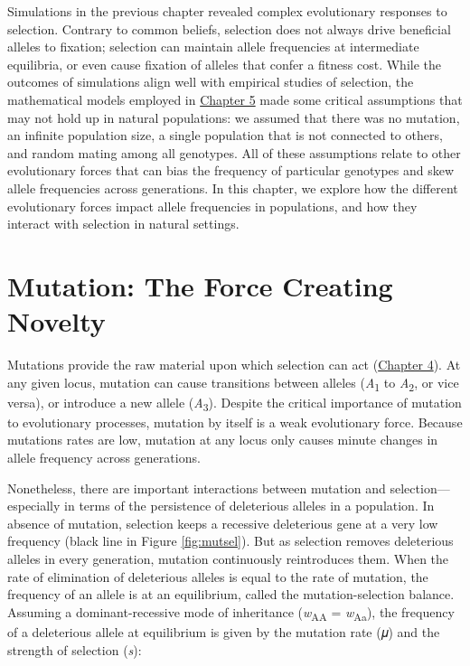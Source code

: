 \documentclass[
]{book}
\begin{document}
Simulations in the previous chapter revealed complex evolutionary responses to selection. Contrary to common beliefs, selection does not always drive beneficial alleles to fixation; selection can maintain allele frequencies at intermediate equilibria, or even cause fixation of alleles that confer a fitness cost. While the outcomes of simulations align well with empirical studies of selection, the mathematical models employed in \href{evolutionary-mechanisms-i-modeling-selection.html}{Chapter 5} made some critical assumptions that may not hold up in natural populations: we assumed that there was no mutation, an infinite population size, a single population that is not connected to others, and random mating among all genotypes. All of these assumptions relate to other evolutionary forces that can bias the frequency of particular genotypes and skew allele frequencies across generations. In this chapter, we explore how the different evolutionary forces impact allele frequencies in populations, and how they interact with selection in natural settings.

\hypertarget{mutation-the-force-creating-novelty}{%
\section{Mutation: The Force Creating Novelty}\label{mutation-the-force-creating-novelty}}

Mutations provide the raw material upon which selection can act (\href{the-raw-materials-for-evolution.html}{Chapter 4}). At any given locus, mutation can cause transitions between alleles (\emph{A}\textsubscript{1} to \emph{A}\textsubscript{2}, or vice versa), or introduce a new allele (\emph{A}\textsubscript{3}). Despite the critical importance of mutation to evolutionary processes, mutation by itself is a weak evolutionary force. Because mutations rates are low, mutation at any locus only causes minute changes in allele frequency across generations.

Nonetheless, there are important interactions between mutation and selection---especially in terms of the persistence of deleterious alleles in a population. In absence of mutation, selection keeps a recessive deleterious gene at a very low frequency (black line in Figure \ref{fig:mutsel}). But as selection removes deleterious alleles in every generation, mutation continuously reintroduces them. When the rate of elimination of deleterious alleles is equal to the rate of mutation, the frequency of an allele is at an equilibrium, called the mutation-selection balance. Assuming a dominant-recessive mode of inheritance (\emph{w}\textsubscript{AA} = \emph{w}\textsubscript{Aa}), the frequency of a deleterious allele at equilibrium is given by the mutation rate (𝜇) and the strength of selection (\emph{s}):
\end{document}
